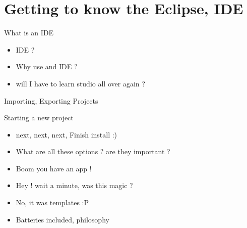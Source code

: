 \documentclass[11pt]{beamer}
\begin{document}
\section{Getting to know the Eclipse, IDE}

\begin{frame}[containsverbatim]{What is an IDE}
	\begin{flushleft}
	\begin{itemize}
	
		\item IDE ? 
		\item Why use and IDE ?
		\item will I have to learn studio all over again ?

	\end{itemize}	
	\end{flushleft}
\end{frame}

\begin{frame}[containsverbatim]{Importing, Exporting Projects}

\end{frame}

\begin{frame}[containsverbatim]{Starting a new project}
	\begin{flushleft}
	\begin{itemize}
	
		\item next, next, next, Finish install :)
		\item What are all these options ? are they important ?
		\item Boom you have an app !
		\item Hey ! wait a minute, was this magic ? 
		\item No, it was templates :P
		\item Batteries included, philosophy 
	\end{itemize}
	\end{flushleft}

\end{frame}
\end{document}

